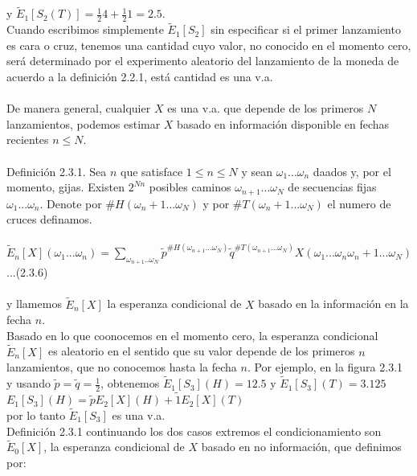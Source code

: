 \documentclass{article}
\begin{document}
         y 
        $\tilde{E}_1[S_2(T)] = \frac{1}{2} 4 + \frac{1}{2} 1 = 2.5$.
        \\
        Cuando escribimos simplemente
        $\tilde{E}_1[S_2]$ sin especificar si el primer lanzamiento es cara o cruz, tenemos una cantidad cuyo valor, no conocido en el momento cero, será determinado
        por el experimento aleatorio del lanzamiento de la moneda de acuerdo a la definición 2.2.1, está cantidad es una v.a.
        \\
        \\
        De manera general, cualquier $X$ es una v.a. que depende de los primeros $N$ lanzamientos, podemos estimar $X$ basado en información disponible en fechas recientes $n \le N$.
        \\
        \\
        Definición 2.3.1. Sea $n$ que satisface $1 \le n \le N$ y sean $\omega_1 ... \omega_n$ daados y, por el momento, gijas. 
        Existen $2^{Nn}$ posibles caminos $\omega_{n+1}...\omega_{N}$ de secuencias fijas $\omega_1...\omega_n$. Denote por
        $\#H(\omega_n+1 ... \omega_N)$ y por $\#T(\omega_n+1 ... \omega_N)$ el numero de cruces definamos.
        \\
        \\
        $\tilde{E}_n[X] (\omega_1...\omega_n) = \sum_{\omega_{n+1} .. \omega_{N}} \tilde{p}^{\#H(\omega_{n+1} ... \omega_N)} \tilde{q}^{\#T(\omega_{n+1} ... \omega_N)} X(\omega_1...\omega_n \omega_n+1...\omega_N)$ ...(2.3.6)
        \\
        \\
        y llamemos $\tilde{E}_n[X]$ la esperanza condicional de $X$ basado en la información en la fecha $n$.
        \\
        Basado en lo que coonocemos en el momento cero, la esperanza condicional $\tilde{E}_n[X]$ es aleatorio en el sentido que su valor depende de los primeros $n$ lanzamientos, que no conocemos hasta la fecha $n$.
        Por ejemplo, en la figura 2.3.1 y usando $\tilde{p} = \tilde{q} = \frac{1}{2}$, obtenemos $\tilde{E}_1[S_3](H) = 12.5$ y $\tilde{E}_1[S_3](T) = 3.125$
        \\
        $E_1[S_3](H) = \tilde{p} E_2[X](H) + \tilde{1} E_2[X](T)$
        \\
        por lo tanto $\tilde{E}_1[S_3]$ es una v.a.
        \\
        Definición 2.3.1 continuando los dos casos extremos el condicionamiento son $\tilde{E}_0[X]$, la esperanza condicional de $X$ basado en no información, que definimos por:
\end{document}
